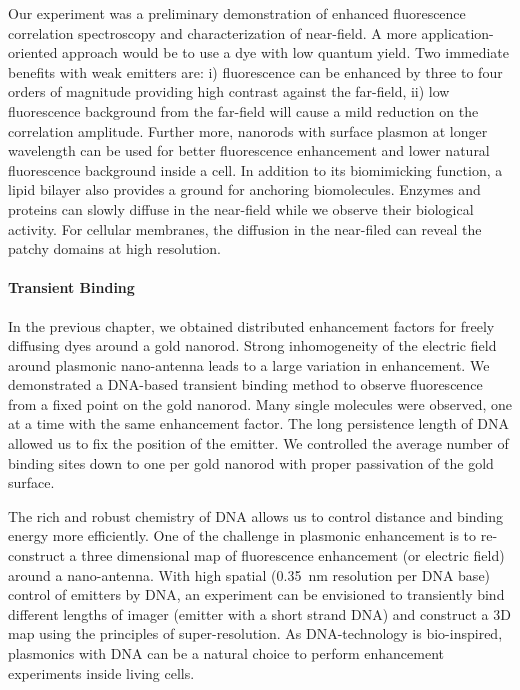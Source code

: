 Our experiment was a preliminary demonstration of enhanced fluorescence correlation spectroscopy and characterization of near-field. A more application-oriented approach would be to use a dye with low quantum yield. Two immediate benefits with weak emitters are: i) fluorescence can be enhanced by three to four orders of magnitude providing high contrast against the far-field, ii) low fluorescence background from the far-field will cause a mild reduction on the correlation amplitude. Further more, nanorods with surface plasmon at longer wavelength can be used for better fluorescence enhancement and lower natural fluorescence background inside a cell. In addition to its biomimicking function, a lipid bilayer also provides a ground for anchoring biomolecules. Enzymes and proteins can slowly diffuse in the near-field while we observe their biological activity. For cellular membranes, the diffusion in the near-filed can reveal the patchy domains at high resolution.

\paragraph*{Transient Binding}
In the previous chapter, we obtained distributed enhancement factors for freely diffusing dyes around a gold nanorod. Strong inhomogeneity of the electric field around plasmonic nano-antenna leads to a large variation in enhancement. We demonstrated a DNA-based transient binding method to observe fluorescence from a fixed point on the gold nanorod. Many single molecules were observed, one at a time with the same enhancement factor. The long persistence length of DNA allowed us to fix the position of the emitter. We controlled the average number of binding sites down to one per gold nanorod with proper passivation of the gold surface.

The rich and robust chemistry of DNA allows us to control distance and binding energy more efficiently. One of the challenge in plasmonic enhancement is to re-construct a three dimensional map of fluorescence enhancement (or electric field) around a nano-antenna. With high spatial (0.35~nm resolution per DNA base) control of emitters by DNA, an experiment can be envisioned to transiently bind different lengths of imager (emitter with a short strand DNA) and construct a 3D map using the principles of super-resolution. As DNA-technology is bio-inspired, plasmonics with DNA can be a natural choice to perform enhancement experiments inside living cells.

